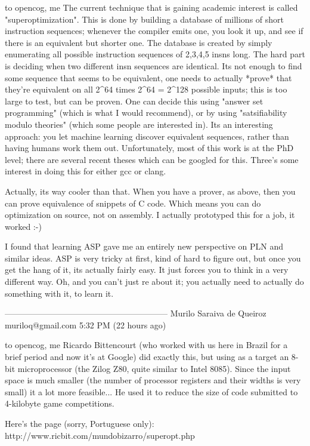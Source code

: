 \documentclass[11pt]{article}
\begin{document}
to opencog, me 
The current technique that is gaining academic interest is called "superoptimization".    This is done by building a database of millions of short instruction sequences; whenever the compiler emits one, you look it up, and see if there is an equivalent but shorter one.  The database is created by simply enumerating all possible instruction sequences of 2,3,4,5 insns long.  The hard part is deciding when two different insn sequences are identical.  Its not enough to find some sequence that seems to be equivalent, one needs to actually *prove* that they're equivalent on all 2^64 times 2^64 = 2^128 possible inputs; this is too large to test, but can be proven.   One can decide this using "answer set programming" (which is what I would recommend), or by using "satsifiability modulo theories" (which some people are interested in).   Its an interesting approach: you let machine learning discover equivalent sequences, rather than having humans work them out.  Unfortunately, most of this work is at the PhD level; there are several recent theses which can be googled for this.   Three's some interest in doing this for either gcc or clang.

Actually, its way cooler than that. When you have a prover, as above, then you can prove equivalence of snippets of C code.  Which means you can do optimization on source, not on assembly.  I actually prototyped this for a job, it worked :-)

I found that learning ASP gave me an entirely new perspective on PLN and similar ideas.   ASP is very tricky at first, kind of hard to figure out, but once you get the hang of it, its actually fairly easy.  It just forces you to think in a very different way.  Oh, and you can't just re about it; you actually need to actually do something with it, to learn it.

-----------------------------------------------------------
Murilo Saraiva de Queiroz muriloq@gmail.com
5:32 PM (22 hours ago)

to opencog, me 
Ricardo Bittencourt (who worked with us here in Brazil for a brief period and now it's at Google) did exactly this, but using as a target an 8-bit microprocessor (the Zilog Z80, quite similar to Intel 8085). Since the input space is much smaller (the number of processor registers and their widths is very small) it a lot more feasible... He used it to reduce the size of code submitted to 4-kilobyte game competitions. 

Here's the page (sorry, Portuguese only):  http://www.ricbit.com/mundobizarro/superopt.php  
\end{document}

